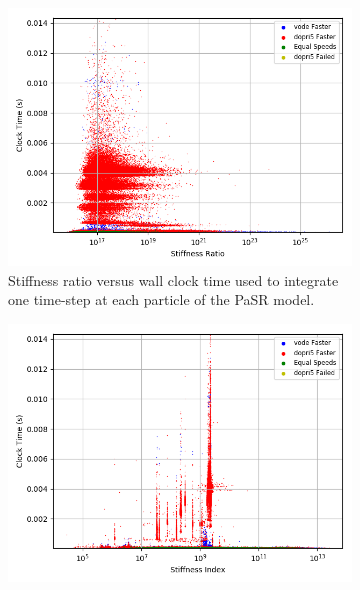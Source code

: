 \documentclass[12pt]{ussci}
\begin{document}
\begin{figure}[htbp]
    \centering
    \begin{subfigure}{0.43\textwidth}
        \includegraphics[width=\linewidth]{H2_CO/PaSR_Int_Times_Ratio_Groupings_1e-07.png}
        \caption{Stiffness ratio versus wall clock time used to integrate one time-step at each particle of the PaSR model.}
        \label{fig:SRH2COPaSR}
    \end{subfigure}
    \hfill
    \begin{subfigure}{0.43\textwidth}
        \includegraphics[width=\linewidth]{H2_CO/PaSR_Int_Times_Index_Groupings_1e-07.png}

\end{subfigure}
\end{figure}
\end{document}
